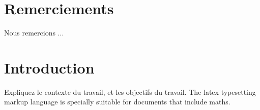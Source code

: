 \documentclass[12pt,a4paper,oneside]{report}
\begin{document}



\chapter*{Remerciements}
\renewcommand{\leftmark}{REMERCIEMENTS}

    Nous remercions ...\\

\newpage

\renewcommand{\leftmark}{TABLE DES MATI\`{E}RES}
\thispagestyle{fancy}
\tableofcontents

\newpage
\listoffigures
{}
\renewcommand{\leftmark}{INTRODUCTION}
\chapter{Introduction}\label{chap:intro}
    
    Expliquez le contexte du travail, et les objectifs du travail.
    The \Gls{latex} typesetting markup language is specially suitable 
    for documents that include \gls{maths}.
    \cite{esp-mesh}

\newpage


\printglossaries

{}


%
\end{document}
